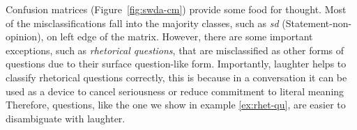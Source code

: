 \documentclass[11pt,a4paper]{article}
\begin{document}

  Confusion matrices (Figure~\ref{fig:swda-cm}) provide some food for
  thought. Most of the misclassifications fall into the majority
  classes, such as \emph{sd} (Statement-non-opinion), on left edge
  of the matrix. However, there are some important exceptions, such as
  \emph{rhetorical questions}, that are misclassified as other forms
  of questions due to their surface question-like form.  Importantly,
  laughter helps to classify rhetorical questions correctly, this is
  because in a conversation it can be used as a device to cancel
  seriousness or reduce commitment to literal meaning %
  \citep{ginzburg2015understanding,tepperman2006yeah} 
  Therefore,
  questions, like the one we show in example \ref{ex:rhet-qu}, are
  easier to disambiguate with laughter.


\begin{lingex}
\item\label{ex:rhet-qu}
  \small
\end{lingex}
\end{document}
